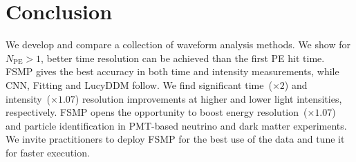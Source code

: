 \section{Conclusion}
\label{sec:conclusion}

We develop and compare a collection of waveform analysis methods.  We show for $N_\mathrm{PE} > 1$, better time resolution can be achieved than the first PE hit time.  FSMP gives the best accuracy in both time and intensity measurements, while CNN, Fitting and LucyDDM follow.  We find significant time~($\times 2$) and intensity~($\times 1.07$) resolution improvements at higher and lower light intensities, respectively.    FSMP opens the opportunity to boost energy resolution~($\times 1.07$) and particle identification in PMT-based neutrino and dark matter experiments.  We invite practitioners to deploy FSMP for the best use of the data and tune it for faster execution.
